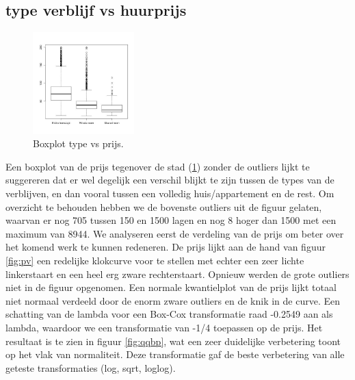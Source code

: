 \documentclass[a4paper,kulak]{kulakarticle} %
\begin{document}
\subsection{type verblijf vs huurprijs} \label{sec:pt}
\begin{figure}
	\begin{center}
		\includegraphics[width=0.35\textwidth]{boxplotPrijsCity.jpg}
	\end{center}
	\caption{Boxplot type vs prijs.}
	\label{fig:bpc}
\end{figure}
Een boxplot van de prijs tegenover de stad (\ref{fig:bpc}) zonder de outliers lijkt te suggereren  dat er wel degelijk een verschil blijkt te zijn tussen de types van de verblijven, en dan vooral tussen een volledig huis/appartement en de rest.
Om overzicht te behouden hebben we de bovenste outliers uit de figuur gelaten, waarvan er nog 705 tussen 150 en 1500 lagen en nog 8 hoger dan 1500 met een maximum van 8944. 
We analyseren eerst de verdeling van de prijs om beter over het komend werk te kunnen redeneren.
De prijs lijkt aan de hand van figuur \ref{fig:pv} een redelijke klokcurve voor te stellen met echter een zeer lichte linkerstaart en een heel erg zware rechterstaart. 
Opnieuw werden de grote outliers niet in de figuur opgenomen.
Een normale kwantielplot van de prijs lijkt totaal niet normaal verdeeld door de enorm zware outliers en de knik in de curve. 
Een schatting van de lambda voor een Box-Cox transformatie raad -0.2549 aan als lambda, waardoor we een transformatie van -1/4 toepassen op de prijs.
Het resultaat is te zien in figuur \ref{fig:qqbp}, wat een zeer duidelijke verbetering toont op het vlak van normaliteit.
Deze transformatie gaf de beste verbetering van alle geteste transformaties (log, sqrt, loglog).
\end{document}
